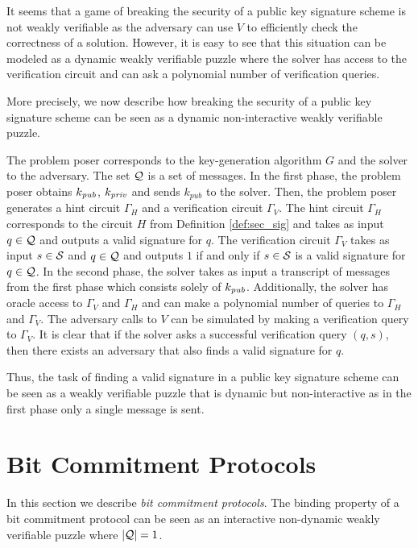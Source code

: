 %
It seems that a game of breaking the security of a public key signature scheme is not weakly verifiable as the adversary can use $V$
to efficiently check the correctness of a solution. However, it is easy to see that this situation can be modeled as
a dynamic weakly verifiable puzzle where the solver has access to the verification circuit and can ask a polynomial number of verification queries.

More precisely, we now describe how breaking the security of a public key signature scheme can be
seen as a dynamic non-interactive weakly verifiable puzzle.

The problem poser corresponds to the key-generation algorithm $G$ and the solver to the adversary. The set $\mathcal{Q}$ is a set of messages.
In the first phase, the problem poser obtains $k_{\operatorname{\mathit{pub}}}$, $k_{\operatorname{\mathit{priv}}}$ and sends $k_{pub}$ to the solver.
Then, the problem poser generates a hint circuit $\Gamma_H$ and a verification circuit $\Gamma_V$.
The hint circuit $\Gamma_H$ corresponds to the circuit $H$ from Definition \ref{def:sec_sig} and takes as input $q \in \mathcal{Q}$ and outputs a valid signature for $q$.
The verification circuit $\Gamma_V$ takes as input $s \in \mathcal{S}$ and $q \in \mathcal{Q}$ and outputs $1$ if and only if $s \in \mathcal{S}$ is a valid signature for $q \in \mathcal{Q}$.
In the second phase, the solver takes as input a transcript of messages from the first phase which consists solely of $k_{\operatorname{\mathit{pub}}}$.
Additionally, the solver has oracle access to $\Gamma_V$ and $\Gamma_H$ and can make a polynomial number of queries to $\Gamma_H$ and $\Gamma_V$.
The adversary calls to $V$ can be simulated by making a verification query to $\Gamma_V$.
It is clear that if the solver asks a successful verification query $(q,s)$,
then there exists an adversary that also finds a valid signature for $q$.

Thus, the task of finding a valid signature in a public key signature scheme can be seen as a weakly verifiable puzzle that
is dynamic but non-interactive as in the first phase only a single message is sent.

\section{Bit Commitment Protocols}
\label{section:bc}
In this section we describe \textit{bit commitment protocols}. The binding property of
a bit commitment protocol can be seen as an interactive non-dynamic weakly verifiable puzzle where $|\mathcal{Q}| = 1$.

